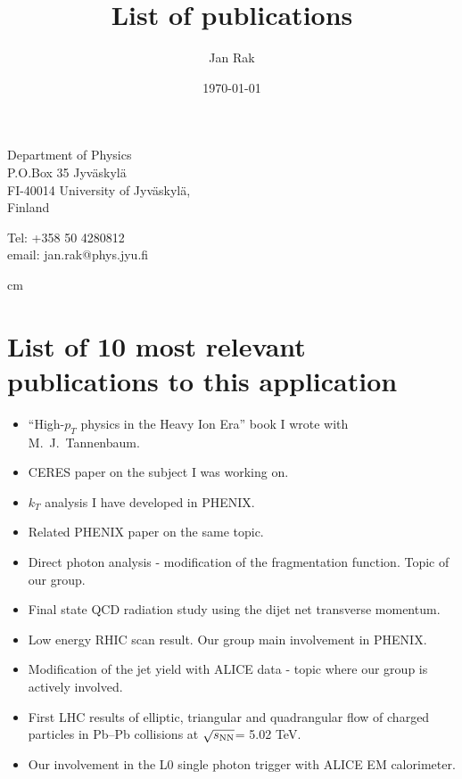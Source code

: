 \documentclass[12pt]{article}
\title{List of publications}
\date{\today}
\author{Jan Rak}
\begin{document}
\maketitle

\parbox{7cm}{
Department of Physics\\
P.O.Box 35 Jyv\"askyl\"a\\
FI-40014 University of Jyv\"askyl\"a,\\ 
Finland}
\hfill
\parbox{5cm}{
Tel: +358 50 4280812\\
email: jan.rak@phys.jyu.fi\\
}

 cm

\section{List of 10 most relevant publications to this application}
\begin{itemize}
\item \cite{JanRak2013} ``High-$p_{T}$ physics in the Heavy Ion Era'' book I wrote with M.~J.~Tannenbaum.
\item \cite{Agakichiev:2003gg} CERES paper on the subject I was working on.
\item \cite{Adler:2006sc} $k_{T}$ analysis I have developed in PHENIX.
\item \cite{Adler:2005ad} Related PHENIX paper on the same topic. %
\item \cite{Adare:2010yw} Direct photon analysis - modification of the fragmentation function. Topic of our group. %
\item \cite{Adam:2015xea} Final state QCD radiation study using the dijet net transverse momentum.
\item \cite{Adare:2012uk}  Low energy RHIC scan result. Our group main involvement in PHENIX. %
\item \cite{Aamodt:2011vg} Modification of the jet yield with ALICE data - topic where our group is actively involved. %
\item \cite{Adam:2016izf} First LHC results of elliptic, triangular and quadrangular flow of charged particles in Pb--Pb collisions at $\sqrt{s_{\rm NN}}$= 5.02 TeV.

\item \cite{Kral:2012ae} Our involvement in the L0 single photon trigger with ALICE EM calorimeter.
\end{itemize}
\end{document}
